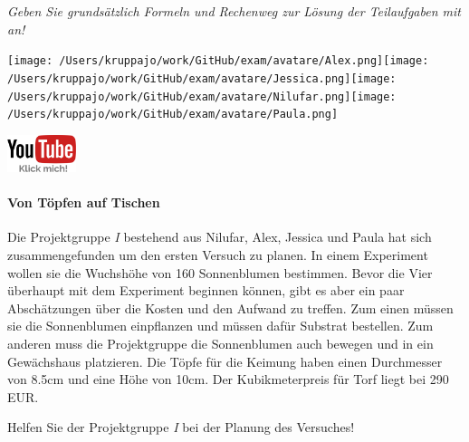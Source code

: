 \documentclass[a4paper, 9pt]{scrartcl}\usepackage[]{graphicx}\usepackage[]{xcolor}
\begin{document}
\textit{Geben Sie grundsätzlich Formeln und Rechenweg zur Lösung der Teilaufgaben mit an!} \\[1Ex]
 

 
\begin{minipage}[t]{0.5\textwidth}
\texttt{[image: /Users/kruppajo/work/GitHub/exam/avatare/Alex.png]}\hspace{-4mm}\texttt{[image: /Users/kruppajo/work/GitHub/exam/avatare/Jessica.png]}\hspace{-4mm}\texttt{[image: /Users/kruppajo/work/GitHub/exam/avatare/Nilufar.png]}\hspace{-4mm}\texttt{[image: /Users/kruppajo/work/GitHub/exam/avatare/Paula.png]}
\end{minipage}
\begin{minipage}[t]{0.5\textwidth}
\hfill
\href{https://youtu.be/57B-yYoFSk0}{\includegraphics[width = 2cm]{img/youtube}}
\end{minipage}




\paragraph{Von Töpfen auf Tischen}



Die Projektgruppe \textit{I} bestehend aus Nilufar, Alex, Jessica und Paula hat sich zusammengefunden um den ersten Versuch zu planen. In einem Experiment wollen sie die Wuchshöhe von 160 Sonnenblumen bestimmen. Bevor die Vier überhaupt mit dem Experiment beginnen können, gibt es aber ein paar Abschätzungen über die Kosten und den Aufwand zu treffen. Zum einen müssen sie die Sonnenblumen einpflanzen und müssen dafür Substrat bestellen. Zum anderen muss die Projektgruppe die Sonnenblumen auch bewegen und in ein Gewächshaus platzieren. Die Töpfe für die Keimung haben
einen Durchmesser von 8.5cm und eine Höhe von 10cm. Der Kubikmeterpreis für Torf liegt bei 290 EUR.

\vspace{1Ex}

Helfen Sie der Projektgruppe \textit{I} bei der Planung des Versuches!
\end{document}
